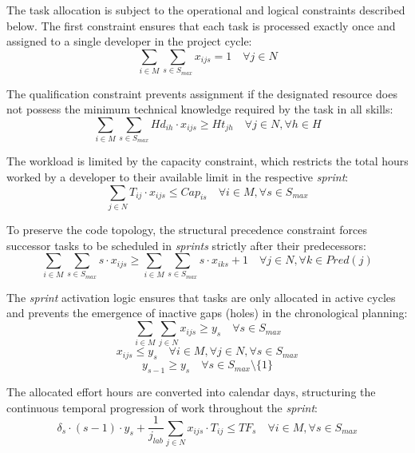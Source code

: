 \documentclass[a4paper,11pt]{article}
\begin{document}
The task allocation is subject to the operational and logical constraints 
described below. The first constraint ensures that each task is processed 
exactly once and assigned to a single developer in the project cycle:
\begin{equation}
    \sum_{i \in M} \sum_{s \in S_{max}} x_{ijs} = 1 \quad \forall j \in N
\end{equation}

The qualification constraint prevents assignment if the designated resource does 
not possess the minimum technical knowledge required by the task in all skills:
\begin{equation}
    \sum_{i \in M} \sum_{s \in S_{max}} Hd_{ih} \cdot x_{ijs} \ge Ht_{jh} \quad \forall j \in N, \forall h \in H
\end{equation}

The workload is limited by the capacity constraint, which restricts the total 
hours worked by a developer to their available limit in the respective \textit{sprint}:
\begin{equation}
    \sum_{j \in N} T_{ij} \cdot x_{ijs} \le Cap_{is} \quad \forall i \in M, \forall s \in S_{max}
\end{equation}

To preserve the code topology, the structural precedence constraint forces 
successor tasks to be scheduled in \textit{sprints} strictly after their 
predecessors:
\begin{equation}
    \sum_{i \in M} \sum_{s \in S_{max}} s \cdot x_{ijs} \ge \sum_{i \in M} \sum_{s \in S_{max}} s \cdot x_{iks} + 1 \quad \forall j \in N, \forall k \in Pred(j)
\end{equation}

The \textit{sprint} activation logic ensures that tasks are only allocated in 
active cycles and prevents the emergence of inactive gaps (holes) in the 
chronological planning:
\begin{equation}
    \sum_{i \in M}\sum_{j \in N} x_{ijs} \ge y_s \quad \forall s \in S_{max}
\end{equation}
\begin{equation}
    x_{ijs} \le y_s \quad \forall i \in M, \forall j \in N, \forall s \in S_{max}
\end{equation}
\begin{equation}
    y_{s-1} \ge y_s \quad \forall s \in S_{max} \setminus \{1\}
\end{equation}

The allocated effort hours are converted into calendar days, structuring the 
continuous temporal progression of work throughout the \textit{sprint}:
\begin{equation}
    \delta_s \cdot (s-1) \cdot y_s + \frac{1}{j_{lab}} \sum_{j \in N} x_{ijs} \cdot T_{ij} \le TF_s \quad \forall i \in M, \forall s \in S_{max}
\end{equation}
\end{document}
